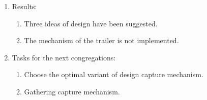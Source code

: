 \begin{enumerate}
\begin{enumerate}
	\end{enumerate}
	
	\item Results:  
	\begin{enumerate}
		\item Three ideas of design have been suggested.
		
		\item The mechanism of the trailer is not implemented.
		
	\end{enumerate}
	
	\item Tasks for the next congregations:
	\begin{enumerate}
		\item Choose the optimal variant of design capture mechanism.
		
		\item Gathering capture mechanism.
		
	\end{enumerate}     
\end{enumerate}
\fillpage

